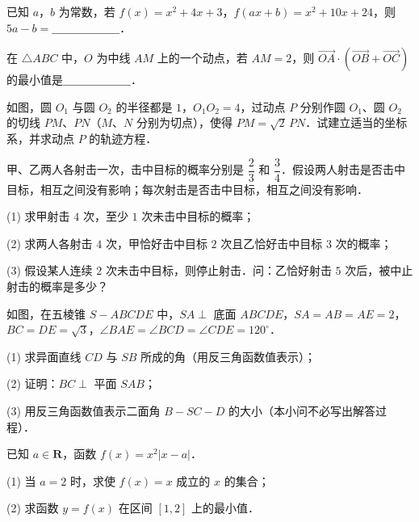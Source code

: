 \begin{question}
已知 $a$，$b$ 为常数，若 $f(x) = x^2 + 4x + 3$，$f(ax + b) = x^2 + 10x + 24$，则 $5a - b =$＿＿＿＿＿＿．

\end{question}
\begin{question}
在 $\triangle ABC$ 中，$O$ 为中线 $AM$ 上的一个动点，若 $AM = 2$，则 $\overrightarrow{OA} \cdot \left(\overrightarrow{OB} + \overrightarrow{OC}\right)$ 的最小值是＿＿＿＿＿＿．

\Needspace{0.4\textheight}
\end{question}
\begin{question}
如图，圆 $O_1$ 与圆 $O_2$ 的半径都是 $1$，$O_1O_2 = 4$，过动点 $P$ 分别作圆 $O_1$、圆 $O_2$ 的切线 $PM$、$PN$（$M$、$N$ 分别为切点），使得 $PM = \sqrt{2}\,PN$．试建立适当的坐标系，并求动点 $P$ 的轨迹方程．
\nopagebreak[4]
\begin{center}\end{center}
\nopagebreak[4]
\end{question}
\begin{question}
甲、乙两人各射击一次，击中目标的概率分别是 $\dfrac{2}{3}$ 和 $\dfrac{3}{4}$．假设两人射击是否击中目标，相互之间没有影响；每次射击是否击中目标，相互之间没有影响．

(1) 求甲射击 $4$ 次，至少 $1$ 次未击中目标的概率；

(2) 求两人各射击 $4$ 次，甲恰好击中目标 $2$ 次且乙恰好击中目标 $3$ 次的概率；

(3) 假设某人连续 $2$ 次未击中目标，则停止射击．问：乙恰好射击 $5$ 次后，被中止射击的概率是多少？

\Needspace{0.4\textheight}
\end{question}
\begin{question}
如图，在五棱锥 $S - ABCDE$ 中，$SA \perp$ 底面 $ABCDE$，$SA = AB = AE = 2$，$BC = DE = \sqrt{3}$，$\angle BAE = \angle BCD = \angle CDE = 120^\circ$．

(1) 求异面直线 $CD$ 与 $SB$ 所成的角（用反三角函数值表示）；

(2) 证明：$BC \perp$ 平面 $SAB$；

(3) 用反三角函数值表示二面角 $B - SC - D$ 的大小（本小问不必写出解答过程）．
\nopagebreak[4]
\begin{center}\end{center}
\nopagebreak[4]
\end{question}
\begin{question}
已知 $a \in \mathbf{R}$，函数 $f(x) = x^2|x - a|$．

(1) 当 $a = 2$ 时，求使 $f(x) = x$ 成立的 $x$ 的集合；

(2) 求函数 $y = f(x)$ 在区间 $[1, 2]$ 上的最小值．

\end{question}
